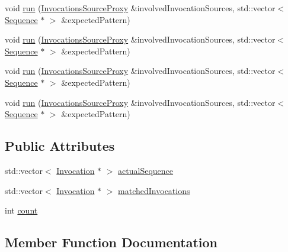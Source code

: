 \begin{DoxyCompactItemize}
void \mbox{\hyperlink{structfakeit_1_1MatchAnalysis_a6c064d01a4c375d30898208326ee3189}{run}} (\mbox{\hyperlink{structfakeit_1_1InvocationsSourceProxy}{Invocations\+Source\+Proxy}} \&involved\+Invocation\+Sources, std\+::vector$<$ \mbox{\hyperlink{classfakeit_1_1Sequence}{Sequence}} $\ast$ $>$ \&expected\+Pattern)
\item 
void \mbox{\hyperlink{structfakeit_1_1MatchAnalysis_a6c064d01a4c375d30898208326ee3189}{run}} (\mbox{\hyperlink{structfakeit_1_1InvocationsSourceProxy}{Invocations\+Source\+Proxy}} \&involved\+Invocation\+Sources, std\+::vector$<$ \mbox{\hyperlink{classfakeit_1_1Sequence}{Sequence}} $\ast$ $>$ \&expected\+Pattern)
\item 
void \mbox{\hyperlink{structfakeit_1_1MatchAnalysis_a6c064d01a4c375d30898208326ee3189}{run}} (\mbox{\hyperlink{structfakeit_1_1InvocationsSourceProxy}{Invocations\+Source\+Proxy}} \&involved\+Invocation\+Sources, std\+::vector$<$ \mbox{\hyperlink{classfakeit_1_1Sequence}{Sequence}} $\ast$ $>$ \&expected\+Pattern)
\item 
void \mbox{\hyperlink{structfakeit_1_1MatchAnalysis_a6c064d01a4c375d30898208326ee3189}{run}} (\mbox{\hyperlink{structfakeit_1_1InvocationsSourceProxy}{Invocations\+Source\+Proxy}} \&involved\+Invocation\+Sources, std\+::vector$<$ \mbox{\hyperlink{classfakeit_1_1Sequence}{Sequence}} $\ast$ $>$ \&expected\+Pattern)
\end{DoxyCompactItemize}
\subsection*{Public Attributes}
\begin{DoxyCompactItemize}
\item 
std\+::vector$<$ \mbox{\hyperlink{structfakeit_1_1Invocation}{Invocation}} $\ast$ $>$ \mbox{\hyperlink{structfakeit_1_1MatchAnalysis_ad85230101b9aa52f9b1d56634afd984e}{actual\+Sequence}}
\item 
std\+::vector$<$ \mbox{\hyperlink{structfakeit_1_1Invocation}{Invocation}} $\ast$ $>$ \mbox{\hyperlink{structfakeit_1_1MatchAnalysis_a838cec9bbcb5e5e9fbe12f9fe6e9dd8e}{matched\+Invocations}}
\item 
int \mbox{\hyperlink{structfakeit_1_1MatchAnalysis_af7cd6b08f370e7746d29b39b31fb7e12}{count}}
\end{DoxyCompactItemize}


\subsection{Member Function Documentation}
\mbox{\label{structfakeit_1_1MatchAnalysis_a6c064d01a4c375d30898208326ee3189}} 
